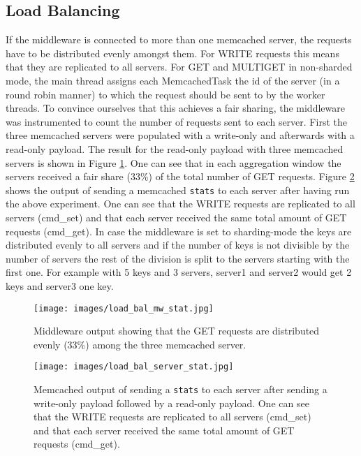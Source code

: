 \documentclass[11pt,a4paper]{article}
\let\tt\texttt
\begin{document}
\subsection{Load Balancing}\label{sub:load_balancing}
If the middleware is connected to more than one memcached server, the requests have to be distributed evenly amongst them. For WRITE requests this means that they are replicated to all servers. For GET  and MULTIGET in non-sharded mode, the main thread assigns each MemcachedTask the id of the server (in a round robin manner) to which the request should be sent to by the worker threads. To convince ourselves that this achieves a fair sharing, the middleware was instrumented to count the number of requests sent to each server. First the three memcached servers were populated with a write-only and afterwards with a read-only payload. The result for the read-only payload with three memcached servers is shown in Figure \ref{fig:load_bal_mw}. One can see that in each aggregation window the servers received a fair share (33\%) of the total number of GET requests. Figure \ref{fig:load_bal_server} shows the output of sending a memcached \tt{stats} to each server after having run the above experiment. One can see that the WRITE requests are replicated to all servers (cmd\_set) and that each server received the same total amount of GET requests (cmd\_get). In case the middleware is set to sharding-mode the keys are distributed evenly to all servers and if the number of keys is not divisible by the number of servers the rest of the division is split to the servers starting with the first one. For example with 5 keys and 3 servers, server1 and server2 would get 2 keys and server3 one key.


\begin{figure}
    \centering
    \texttt{[image: images/load\_bal\_mw\_stat.jpg]}
    \caption{Middleware output showing that the GET requests are distributed evenly (33\%) among the three memcached server.}
    \label{fig:load_bal_mw}
\end{figure}

\begin{figure}
    \centering
    \texttt{[image: images/load\_bal\_server\_stat.jpg]}
    \caption{Memcached output of sending a \tt{stats} to each server after sending a write-only payload followed by a read-only payload. One can see that the WRITE requests are replicated to all servers (cmd\_set) and that each server received the same total amount of GET requests (cmd\_get).}
    \label{fig:load_bal_server}
\end{figure}
\end{document}
